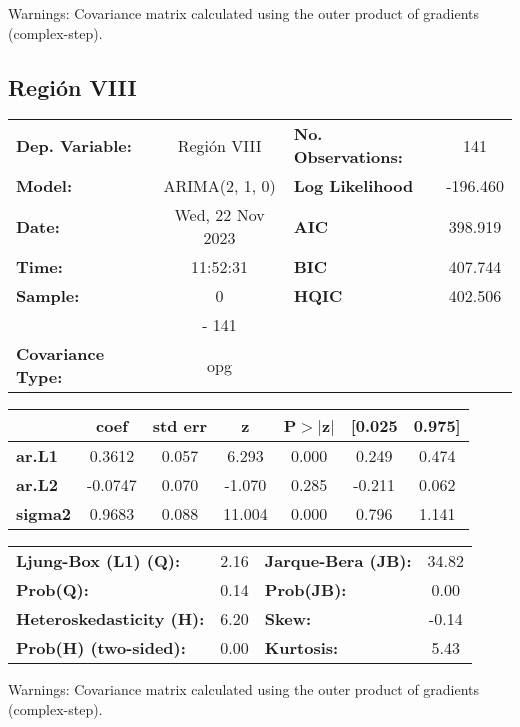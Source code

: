 \documentclass{article}%
\begin{document}
Warnings: \newline
 [1] Covariance matrix calculated using the outer product of gradients (complex-step).%
\subsection*{Región VIII}%
\begin{center}
\begin{tabular}{lclc}
\toprule
\textbf{Dep. Variable:}          &   Región VIII    & \textbf{  No. Observations:  } &    141      \\
\textbf{Model:}                  &  ARIMA(2, 1, 0)  & \textbf{  Log Likelihood     } &  -196.460   \\
\textbf{Date:}                   & Wed, 22 Nov 2023 & \textbf{  AIC                } &  398.919    \\
\textbf{Time:}                   &     11:52:31     & \textbf{  BIC                } &  407.744    \\
\textbf{Sample:}                 &        0         & \textbf{  HQIC               } &  402.506    \\
\textbf{}                        &       - 141      & \textbf{                     } &             \\
\textbf{Covariance Type:}        &       opg        & \textbf{                     } &             \\
\bottomrule
\end{tabular}
\begin{tabular}{lcccccc}
                & \textbf{coef} & \textbf{std err} & \textbf{z} & \textbf{P$> |$z$|$} & \textbf{[0.025} & \textbf{0.975]}  \\
\midrule
\textbf{ar.L1}  &       0.3612  &        0.057     &     6.293  &         0.000        &        0.249    &        0.474     \\
\textbf{ar.L2}  &      -0.0747  &        0.070     &    -1.070  &         0.285        &       -0.211    &        0.062     \\
\textbf{sigma2} &       0.9683  &        0.088     &    11.004  &         0.000        &        0.796    &        1.141     \\
\bottomrule
\end{tabular}
\begin{tabular}{lclc}
\textbf{Ljung-Box (L1) (Q):}     & 2.16 & \textbf{  Jarque-Bera (JB):  } & 34.82  \\
\textbf{Prob(Q):}                & 0.14 & \textbf{  Prob(JB):          } &  0.00  \\
\textbf{Heteroskedasticity (H):} & 6.20 & \textbf{  Skew:              } & -0.14  \\
\textbf{Prob(H) (two-sided):}    & 0.00 & \textbf{  Kurtosis:          } &  5.43  \\
\bottomrule
\end{tabular}
\end{center}

Warnings: \newline
 [1] Covariance matrix calculated using the outer product of gradients (complex-step).

%
\end{document}
